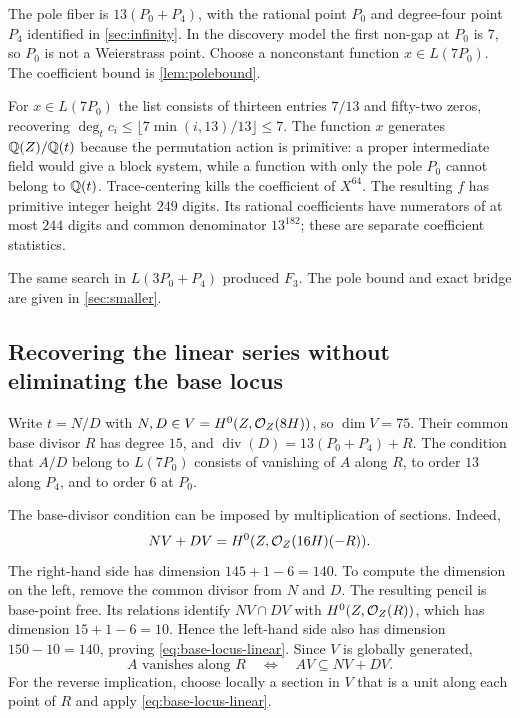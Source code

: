 The pole fiber is $13(P_0+P_4)$, with the rational point $P_0$ and
degree-four point $P_4$ identified in \cref{sec:infinity}.
In the discovery model the first non-gap at $P_0$
is $7$, so $P_0$ is not a Weierstrass point. Choose a nonconstant function
$x\in L(7P_0)$. The coefficient bound is \cref{lem:polebound}.

For $x\in L(7P_0)$ the list consists of thirteen entries $7/13$ and
fifty-two zeros, recovering
$\deg_t c_i\leq\lfloor7\min(i,13)/13\rfloor\leq7$.
The function $x$ generates $\mathbb{Q}(Z)/\mathbb{Q}(t)$ because the permutation action
is primitive: a proper intermediate field would give a block system,
while a function with only the pole $P_0$ cannot belong to $\mathbb{Q}(t)$.
Trace-centering kills the coefficient of $X^{64}$.
The resulting $f$ has primitive integer height $249$ digits. Its rational
coefficients have numerators of at most $244$ digits and common denominator
$13^{182}$; these are separate coefficient statistics.

The same search in $L(3P_0+P_4)$ produced $F_3$. The pole bound and
exact bridge are given in \cref{sec:smaller}.

\subsection{Recovering the linear series without eliminating the base locus}

Write $t=N/D$ with $N,D\in V=H^0(Z,\mathcal{O}_Z(8H))$, so $\dim V=75$.
Their common base divisor $R$ has degree $15$, and
$\operatorname{div}(D)=13(P_0+P_4)+R$. The condition that $A/D$ belong to
$L(7P_0)$ consists of vanishing of $A$ along $R$, to order $13$ along
$P_4$, and to order $6$ at $P_0$.

The base-divisor condition can be imposed by multiplication of sections.
Indeed,
\begin{equation}\label{eq:base-locus-linear}
 NV+DV=H^0(Z,\mathcal{O}_Z(16H)(-R)).
\end{equation}
The right-hand side has dimension $145+1-6=140$. To compute the dimension
on the left, remove the common divisor from $N$ and $D$. The resulting
pencil is base-point free. Its relations identify $NV\cap DV$ with
$H^0(Z,\mathcal{O}_Z(R))$, which has dimension $15+1-6=10$. Hence the left-hand
side also has dimension $150-10=140$, proving \eqref{eq:base-locus-linear}.
Since $V$ is globally generated,
\begin{equation}\label{eq:membership}
 A\text{ vanishes along }R\quad\Longleftrightarrow\quad AV\subseteq NV+DV.
\end{equation}
For the reverse implication, choose locally a section in $V$ that is a
unit along each point of $R$ and apply \eqref{eq:base-locus-linear}.

